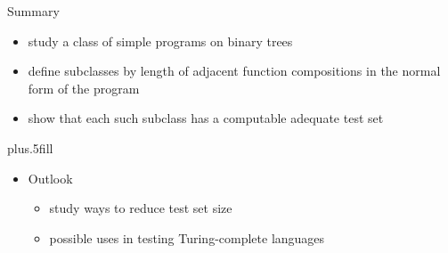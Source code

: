 \documentclass{beamer}
\begin{document}
\begin{frame}{Summary}

  \begin{itemize}
  \item study a class of simple programs on binary trees
  \item define subclasses by length of adjacent function compositions 
    in the normal form of the program
  \item show that each such subclass has a computable adequate test set
  \end{itemize}
  
  \vskip0pt plus.5fill
  \begin{itemize}
  \item
    Outlook
    \begin{itemize}
    \item study ways to reduce test set size
    \item possible uses in testing Turing-complete languages
    \end{itemize}
  \end{itemize}
\end{frame}
\end{document}
